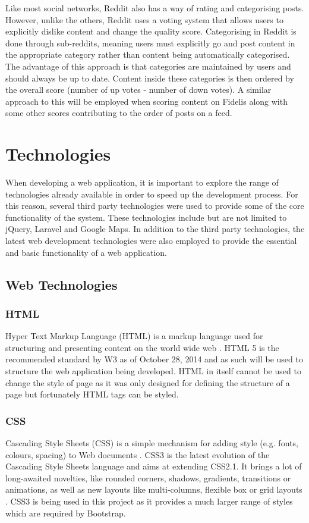 Like most social networks, Reddit also has a way of rating and categorising posts. However, unlike the others, Reddit uses a voting system that allows users to explicitly dislike content and change the quality score. Categorising in Reddit is done through sub-reddits, meaning users must explicitly go and post content in the appropriate category rather than content being automatically categorised. The advantage of this approach is that categories are maintained by users and should always be up to date. Content inside these categories is then ordered by the overall score (number of up votes - number of down votes). A similar approach to this will be employed when scoring content on Fidelis along with some other scores contributing to the order of posts on a feed.

\section{Technologies}
\label{Section:Technologies}
When developing a web application, it is important to explore the range of technologies already available in order to speed up the development process. For this reason, several third party technologies were used to provide some of the core functionality of the system. These technologies include but are not limited to jQuery, Laravel and Google Maps. In addition to the third party technologies, the latest web development technologies were also employed to provide the essential and basic functionality of a web application.

\subsection{Web Technologies} \label{Section:Web_Technologies}

\subsubsection{HTML} 
Hyper Text Markup Language (HTML) is a markup language used for structuring and presenting content on the world wide web \cite{W3:HTML5}. HTML 5 is the recommended standard by W3 as of October 28, 2014 and as such will be used to structure the web application being developed. HTML in itself cannot be used to change the style of page as it was only designed for defining the structure of a page but fortunately HTML tags can be styled. 

\subsubsection{CSS} 
Cascading Style Sheets (CSS) is a simple mechanism for adding style (e.g. fonts, colours, spacing) to Web documents \cite{W3:CSS}. CSS3 is the latest evolution of the Cascading Style Sheets language and aims at extending CSS2.1. It brings a lot of long-awaited novelties, like rounded corners, shadows, gradients, transitions or animations, as well as new layouts like multi-columns, flexible box or grid layouts \cite{Mozilla:CSS3}. CSS3 is being used in this project as it provides a much larger range of styles which are required by Bootstrap.

